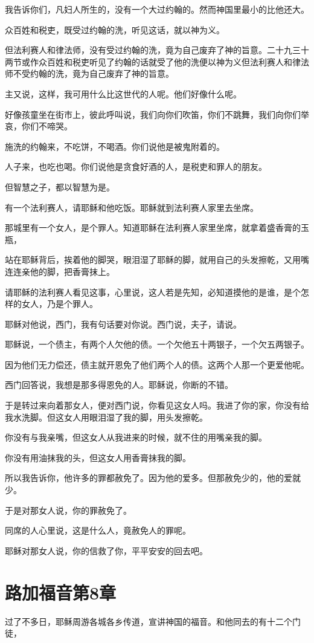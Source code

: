\documentclass[12pt,oneside]{book}
\begin{document}
我告诉你们，凡妇人所生的，没有一个大过约翰的。然而神国里最小的比他还大。

众百姓和税吏，既受过约翰的洗，听见这话，就以神为义。

但法利赛人和律法师，没有受过约翰的洗，竟为自己废弃了神的旨意。二十九三十两节或作众百姓和税吏听见了约翰的话就受了他的洗便以神为义但法利赛人和律法师不受约翰的洗，竟为自己废弃了神的旨意。

主又说，这样，我可用什么比这世代的人呢。他们好像什么呢。

好像孩童坐在街市上，彼此呼叫说，我们向你们吹笛，你们不跳舞，我们向你们举哀，你们不啼哭。

施洗的约翰来，不吃饼，不喝酒。你们说他是被鬼附着的。

人子来，也吃也喝。你们说他是贪食好酒的人，是税吏和罪人的朋友。

但智慧之子，都以智慧为是。

有一个法利赛人，请耶稣和他吃饭。耶稣就到法利赛人家里去坐席。

那城里有一个女人，是个罪人。知道耶稣在法利赛人家里坐席，就拿着盛香膏的玉瓶，

站在耶稣背后，挨着他的脚哭，眼泪湿了耶稣的脚，就用自己的头发擦乾，又用嘴连连亲他的脚，把香膏抹上。

请耶稣的法利赛人看见这事，心里说，这人若是先知，必知道摸他的是谁，是个怎样的女人，乃是个罪人。

耶稣对他说，西门，我有句话要对你说。西门说，夫子，请说。

耶稣说，一个债主，有两个人欠他的债。一个欠他五十两银子，一个欠五两银子。

因为他们无力偿还，债主就开恩免了他们两个人的债。这两个人那一个更爱他呢。

西门回答说，我想是那多得恩免的人。耶稣说，你断的不错。

于是转过来向着那女人，便对西门说，你看见这女人吗。我进了你的家，你没有给我水洗脚。但这女人用眼泪湿了我的脚，用头发擦乾。

你没有与我亲嘴，但这女人从我进来的时候，就不住的用嘴亲我的脚。

你没有用油抹我的头，但这女人用香膏抹我的脚。

所以我告诉你，他许多的罪都赦免了。因为他的爱多。但那赦免少的，他的爱就少。

于是对那女人说，你的罪赦免了。

同席的人心里说，这是什么人，竟赦免人的罪呢。

耶稣对那女人说，你的信救了你，平平安安的回去吧。

\chapter{路加福音第8章}
过了不多日，耶稣周游各城各乡传道，宣讲神国的福音。和他同去的有十二个门徒，
\end{document}
